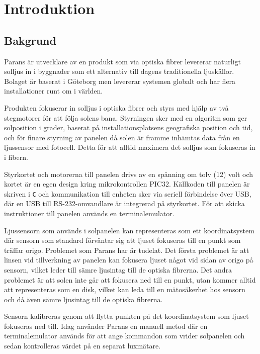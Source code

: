 \section{Introduktion} %
\label{sec:indroduktion}

    \subsection{Bakgrund} %
    \label{sub:bakgrund}
        Parans är utvecklare av en produkt som via optiska fibrer levererar naturligt solljus in i byggnader som ett alternativ till dagens traditionella ljuskällor. 
        Bolaget är baserat i Göteborg men levererar systemen globalt och har flera installationer runt om i världen. \bigskip

        Produkten fokuserar in solljus i optiska fibrer och styrs med hjälp av två stegmotorer för att följa solens bana. 
        Styrningen sker med en algoritm som ger solposition i grader, baserat på installationsplatsens geografiska position och tid, och för finare styrning av panelen då solen är framme inhämtas data från en ljussensor med fotocell.
        Detta för att alltid maximera det solljus som fokuseras in i fibern.\bigskip

        Styrkortet och motorerna till panelen drivs av en spänning om tolv (12) volt och kortet är en egen design kring mikrokontrollen PIC32. 
        Källkoden till panelen är skriven i \texttt{C} och kommunikation till enheten sker via seriell förbindelse över USB, där en USB till RS-232-omvandlare är integrerad på styrkortet. För att skicka instruktioner till panelen används en terminalemulator. \bigskip

        Ljussensorn som används i solpanelen kan representeras som ett koordinatsystem där sensorn som standard förväntar sig att ljuset fokuseras till en punkt som träffar origo. 
        Problemet som Parans har är tudelat. Det första problemet är att linsen vid tillverkning av panelen kan fokusera ljuset något vid sidan av origo på sensorn, vilket leder till sämre ljusintag till de optiska fibrerna. 
        Det andra problemet är att solen inte går att fokusera ned till en punkt, utan kommer alltid att representeras som en disk, vilket kan leda till en mätosäkerhet hos sensorn och då även sämre ljusintag till de optiska fibrerna. \bigskip

        Sensorn kalibreras genom att flytta punkten på det koordinatsystem som ljuset fokuseras ned till. Idag använder Parans en manuell metod där en terminalemulator används för att ange kommandon som vrider solpanelen och sedan kontrolleras värdet på en separat luxmätare.

